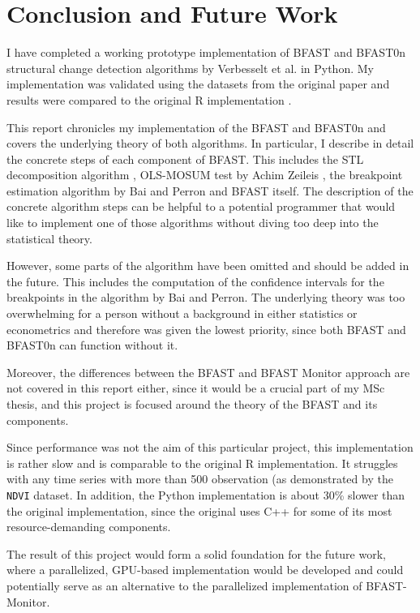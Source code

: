 \documentclass[main.tex]{subfiles}
\begin{document}
\chapter{Conclusion and Future Work}
\label{chap:conclusion_and_future_work}
I have completed a working prototype implementation of BFAST and BFAST0n
structural change detection algorithms by Verbesselt et al. \cite{bfast} in
Python. My implementation was validated using the datasets from the original
paper and results were compared to the original R implementation \cite{bfast-github}.

This report chronicles my implementation of the BFAST and BFAST0n and covers the
underlying theory of both algorithms. In particular, I describe in detail the
concrete steps of each component of BFAST. This includes the STL decomposition
algorithm \cite{stl}, OLS-MOSUM test by Achim Zeileis \cite{strucchange}, the
breakpoint estimation algorithm by Bai and Perron \cite{bai_perron} and BFAST
itself. The description of the concrete algorithm steps can be helpful to a
potential programmer that would like to implement one of those algorithms
without diving too deep into the statistical theory. 

However, some parts of the algorithm have been omitted and should be added in
the future. This includes the computation of the confidence intervals for the
breakpoints in the algorithm by Bai and Perron. The underlying theory was too
overwhelming for a person without a background in either statistics or
econometrics and therefore was given the lowest priority, since both BFAST and
BFAST0n can function without it.

Moreover, the differences between the BFAST and BFAST Monitor \cite{bfast_monitor}
approach are not covered in this report either, since it would be a crucial part of my
MSc thesis, and this project is focused around the theory of the BFAST and its components.

Since performance was not the aim of this particular project, this
implementation is rather slow and is comparable to the original R
implementation. It struggles with any time series with more than 500
observation (as demonstrated by the \texttt{NDVI} dataset. In addition, the Python
implementation is about 30\% slower than the original implementation, since
the original uses C++ for some of its most resource-demanding components.

The result of this project would form a solid foundation for
the future work, where a parallelized, GPU-based implementation would be developed and
could potentially serve as an alternative to the parallelized implementation of
BFAST-Monitor. 


\biblio
\end{document}
